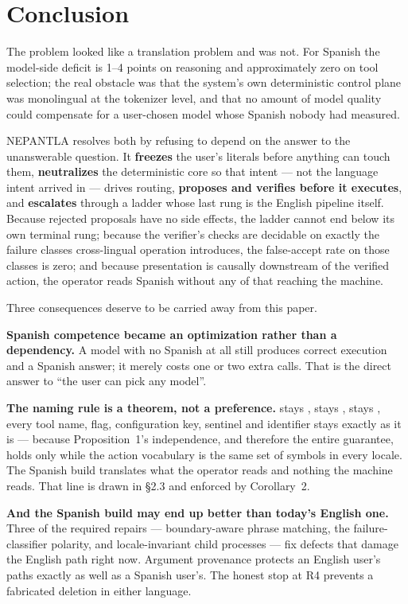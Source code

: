 \section{Conclusion}
\label{sec:conclusion}

The problem looked like a translation problem and was not. For Spanish the model-side
deficit is 1--4 points on reasoning and approximately zero on tool selection; the real
obstacle was that the system's own deterministic control plane was monolingual at the
tokenizer level, and that no amount of model quality could compensate for a user-chosen
model whose Spanish nobody had measured.

NEPANTLA resolves both by refusing to depend on the answer to the unanswerable question.
It \textbf{freezes} the user's literals before anything can touch them,
\textbf{neutralizes} the deterministic core so that intent --- not the language intent
arrived in --- drives routing, \textbf{proposes and verifies before it executes}, and
\textbf{escalates} through a ladder whose last rung is the English pipeline itself.
Because rejected proposals have no side effects, the ladder cannot end below its own
terminal rung; because the verifier's checks are decidable on exactly the failure classes
cross-lingual operation introduces, the false-accept rate on those classes is zero; and
because presentation is causally downstream of the verified action, the operator reads
Spanish without any of that reaching the machine.

Three consequences deserve to be carried away from this paper.

\textbf{Spanish competence became an optimization rather than a dependency.} A model with
no Spanish at all still produces correct execution and a Spanish answer; it merely costs
one or two extra calls. That is the direct answer to ``the user can pick any model''.

\textbf{The naming rule is a theorem, not a preference.}  stays
,  stays ,  stays , every
tool name, flag, configuration key, sentinel and identifier stays exactly as it is ---
because Proposition~1's independence, and therefore the entire guarantee, holds only
while the action vocabulary is the same set of symbols in every locale. The Spanish build
translates what the operator reads and nothing the machine reads. That line is drawn in
\S2.3 and enforced by Corollary~2.

\textbf{And the Spanish build may end up better than today's English one.} Three of the
required repairs --- boundary-aware phrase matching, the failure-classifier polarity, and
locale-invariant child processes --- fix defects that damage the English path right now.
Argument provenance protects an English user's paths exactly as well as a Spanish user's.
The honest stop at R4 prevents a fabricated deletion in either language.

